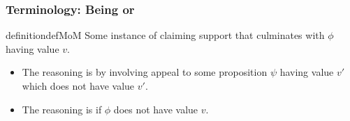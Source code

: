 \subsubsection{Terminology: Being \mistaken{} or \misled{}}
\label{sec:presence}

\begin{note}
  \begin{restatable}{definition}{defMoM}\label{def:MoM}
    Some instance of claiming support that culminates with \(\phi\) having value \(v\).
    \begin{itemize}
      \item The reasoning is \emph{\mistaken{}} by involving appeal to some proposition \(\psi\) having value \(v'\) which does not have value \(v'\).
    \item The reasoning is \emph{\misled{}} if \(\phi\) does not have value \(v\).
    \end{itemize}
    \vspace{-\baselineskip}
  \end{restatable}
\end{note}

